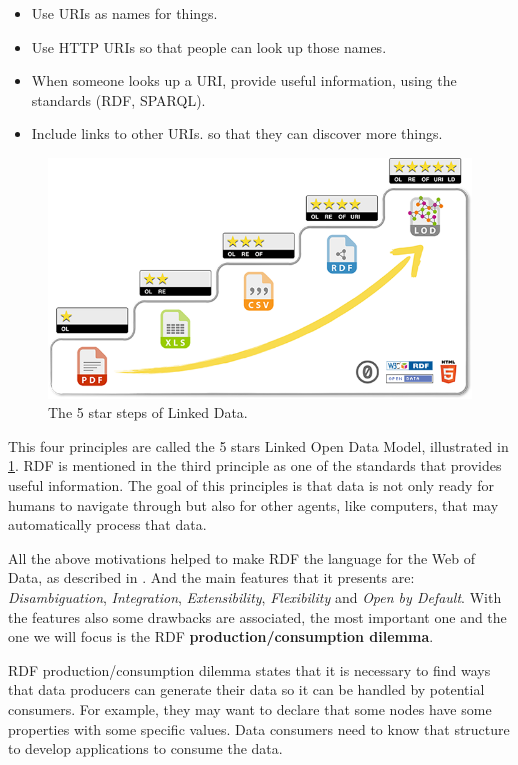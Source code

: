 \begin{itemize}
  \item Use URIs as names for things.
  \item Use HTTP URIs so that people can look up those names.
  \item When someone looks up a URI, provide useful information, using the standards (RDF, SPARQL).
  \item Include links to other URIs. so that they can discover more things.
\end{itemize}

\begin{figure}
    \includegraphics[scale=0.25]{images/5-star-steps.png}
    \centering
	\caption[The 5 star steps of Linked Data]{The 5 star steps of Linked Data.}
	\label{fig:margin-5-star-steps}
\end{figure}

This four principles are called the 5 stars Linked Open Data Model, illustrated in \cref{fig:margin-5-star-steps}.
RDF is mentioned in the third principle as one of the standards that provides useful information. The goal of this
principles is that data is not only ready for humans to navigate through but also for other agents, like computers,
that may automatically process that data.

All the above motivations helped to make RDF the language for the Web of Data, as described in \cite{labra-validating-rdf}.
And the main features that it presents are: \textit{Disambiguation}, \textit{Integration}, \textit{Extensibility}, \textit{Flexibility} and \textit{Open by Default}.
With the features also some drawbacks are associated, the most important one and the one we will focus is the RDF
\textbf{production/consumption dilemma}.

RDF production/consumption dilemma states that it is necessary to find ways that data producers can generate their data so
it can be handled by potential consumers. For example, they may want to declare that some nodes have some properties with
some specific values. Data consumers need to know that structure to develop applications to consume the data.

